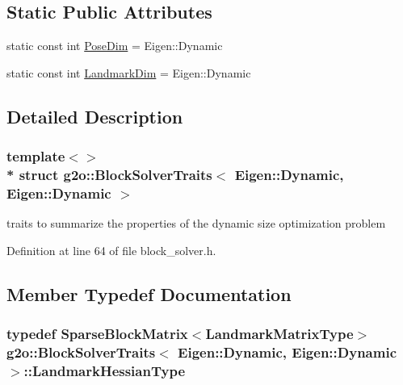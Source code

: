 \subsection*{Static Public Attributes}
\begin{DoxyCompactItemize}
\item 
static const int \hyperlink{structg2o_1_1BlockSolverTraits_3_01Eigen_1_1Dynamic_00_01Eigen_1_1Dynamic_01_4_a04a2cc2de80563b4b21f815150c3b0ec}{Pose\+Dim} = Eigen\+::\+Dynamic
\item 
static const int \hyperlink{structg2o_1_1BlockSolverTraits_3_01Eigen_1_1Dynamic_00_01Eigen_1_1Dynamic_01_4_aa8f7b7c3fc1ce4a7d61e925e3067e196}{Landmark\+Dim} = Eigen\+::\+Dynamic
\end{DoxyCompactItemize}


\subsection{Detailed Description}
\subsubsection*{template$<$$>$\\*
struct g2o\+::\+Block\+Solver\+Traits$<$ Eigen\+::\+Dynamic, Eigen\+::\+Dynamic $>$}

traits to summarize the properties of the dynamic size optimization problem 

Definition at line 64 of file block\+\_\+solver.\+h.



\subsection{Member Typedef Documentation}
\subsubsection[{\texorpdfstring{Landmark\+Hessian\+Type}{LandmarkHessianType}}]{\setlength{\rightskip}{0pt plus 5cm}typedef {\bf Sparse\+Block\+Matrix}$<${\bf Landmark\+Matrix\+Type}$>$ {\bf g2o\+::\+Block\+Solver\+Traits}$<$ Eigen\+::\+Dynamic, Eigen\+::\+Dynamic $>$\+::{\bf Landmark\+Hessian\+Type}}\hypertarget{structg2o_1_1BlockSolverTraits_3_01Eigen_1_1Dynamic_00_01Eigen_1_1Dynamic_01_4_a73a81a0aeabd1216ae3a8f5700666ac4}{}\label{structg2o_1_1BlockSolverTraits_3_01Eigen_1_1Dynamic_00_01Eigen_1_1Dynamic_01_4_a73a81a0aeabd1216ae3a8f5700666ac4}



